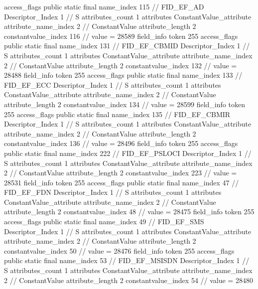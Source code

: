 {{{{{				access_flags	public static final
				name_index	115		// FID_EF_AD
				Descriptor_Index	1		// S
				attributes_count	1
				attributes {
				ConstantValue_attribute {
					attribute_name_index	2		// ConstantValue
					attribute_length	2
					constantvalue_index	116		// value = 28589
				}
				}
			}
			field_info {
				token	255
				access_flags	public static final
				name_index	131		// FID_EF_CBMID
				Descriptor_Index	1		// S
				attributes_count	1
				attributes {
				ConstantValue_attribute {
					attribute_name_index	2		// ConstantValue
					attribute_length	2
					constantvalue_index	132		// value = 28488
				}
				}
			}
			field_info {
				token	255
				access_flags	public static final
				name_index	133		// FID_EF_ECC
				Descriptor_Index	1		// S
				attributes_count	1
				attributes {
				ConstantValue_attribute {
					attribute_name_index	2		// ConstantValue
					attribute_length	2
					constantvalue_index	134		// value = 28599
				}
				}
			}
			field_info {
				token	255
				access_flags	public static final
				name_index	135		// FID_EF_CBMIR
				Descriptor_Index	1		// S
				attributes_count	1
				attributes {
				ConstantValue_attribute {
					attribute_name_index	2		// ConstantValue
					attribute_length	2
					constantvalue_index	136		// value = 28496
				}
				}
			}
			field_info {
				token	255
				access_flags	public static final
				name_index	222		// FID_EF_PSLOCI
				Descriptor_Index	1		// S
				attributes_count	1
				attributes {
				ConstantValue_attribute {
					attribute_name_index	2		// ConstantValue
					attribute_length	2
					constantvalue_index	223		// value = 28531
				}
				}
			}
			field_info {
				token	255
				access_flags	public static final
				name_index	47		// FID_EF_FDN
				Descriptor_Index	1		// S
				attributes_count	1
				attributes {
				ConstantValue_attribute {
					attribute_name_index	2		// ConstantValue
					attribute_length	2
					constantvalue_index	48		// value = 28475
				}
				}
			}
			field_info {
				token	255
				access_flags	public static final
				name_index	49		// FID_EF_SMS
				Descriptor_Index	1		// S
				attributes_count	1
				attributes {
				ConstantValue_attribute {
					attribute_name_index	2		// ConstantValue
					attribute_length	2
					constantvalue_index	50		// value = 28476
				}
				}
			}
			field_info {
				token	255
				access_flags	public static final
				name_index	53		// FID_EF_MSISDN
				Descriptor_Index	1		// S
				attributes_count	1
				attributes {
				ConstantValue_attribute {
					attribute_name_index	2		// ConstantValue
					attribute_length	2
					constantvalue_index	54		// value = 28480
}}}}}}}
